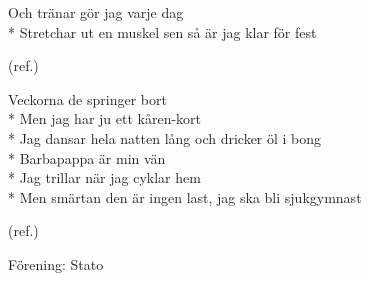 \begin{SongText}[Sjukgymnastlåten]
\begin{Verse}
        Och tränar gör jag varje dag\\*%
        Stretchar ut en muskel sen så är jag klar för fest
    \end{Verse}
    \begin{Verse}
        (ref.)
    \end{Verse}
    \begin{Verse}
        Veckorna de springer bort\\*%
        Men jag har ju ett kåren-kort\\*%
        Jag dansar hela natten lång och dricker öl i bong\\*%
        Barbapappa är min vän\\*%
        Jag trillar när jag cyklar hem\\*%
        Men smärtan den är ingen last, jag ska bli sjukgymnast
    \end{Verse}
    \begin{Verse}
        (ref.)
    \end{Verse}
\end{SongText}

\begin{SongText}[???]
    \begin{SongInfo}
        Förening: Stato
    \end{SongInfo}
    \begin{Verse}
        [NO SONG]
    \end{Verse}
\end{SongText}

